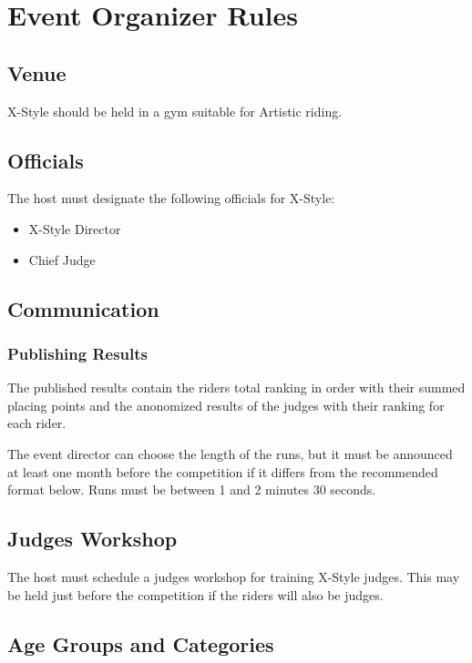 \chapter{Event Organizer Rules}

\section{Venue}

X-Style should be held in a gym suitable for Artistic riding. %

\section{Officials}

The host must designate the following officials for X-Style:
\begin{itemize}
\item X-Style Director
\item Chief Judge
\end{itemize}

\section{Communication}

\subsection{Publishing Results}
The published results contain the riders total ranking in order with their summed placing points and the anonomized results of the judges with their ranking for each rider.

The event director can choose the length of the runs, but it must be announced at least one month before the competition if it differs from the recommended format below.
Runs must be between 1 and 2 minutes 30 seconds.

\section{Judges Workshop}

The host must schedule a judges workshop for training X-Style judges.
This may be held just before the competition if the riders will also be judges.

\section{Age Groups and Categories}

